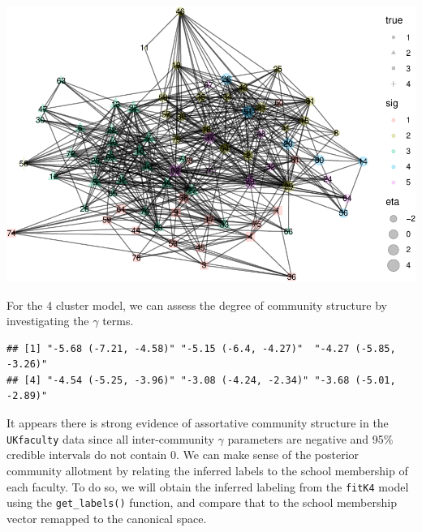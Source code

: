 \documentclass[]{article}
\newenvironment{Shaded}{\begin{snugshade}}{\end{snugshade}}
\newcommand{\DecValTok}[1]{\textcolor[rgb]{0.00,0.00,0.81}{#1}}
\newcommand{\KeywordTok}[1]{\textcolor[rgb]{0.13,0.29,0.53}{\textbf{#1}}}
\newcommand{\NormalTok}[1]{#1}
\newcommand{\OperatorTok}[1]{\textcolor[rgb]{0.81,0.36,0.00}{\textbf{#1}}}
\newcommand{\StringTok}[1]{\textcolor[rgb]{0.31,0.60,0.02}{#1}}
\begin{document}
\includegraphics{karate_test_files/figure-latex/unnamed-chunk-21-1.pdf}

For the 4 cluster model, we can assess the degree of community structure
by investigating the \(\gamma\) terms.

\begin{Shaded}
\end{Shaded}

\begin{verbatim}
## [1] "-5.68 (-7.21, -4.58)" "-5.15 (-6.4, -4.27)"  "-4.27 (-5.85, -3.26)"
## [4] "-4.54 (-5.25, -3.96)" "-3.08 (-4.24, -2.34)" "-3.68 (-5.01, -2.89)"
\end{verbatim}

It appears there is strong evidence of assortative community structure
in the \texttt{UKfaculty} data since all inter-community \(\gamma\)
parameters are negative and 95\% credible intervals do not contain 0. We
can make sense of the posterior community allotment by relating the
inferred labels to the school membership of each faculty. To do so, we
will obtain the inferred labeling from the \texttt{fitK4} model using
the \texttt{get\_labels()} function, and compare that to the school
membership vector remapped to the canonical space.

\begin{Shaded}
\end{Shaded}
\end{document}
